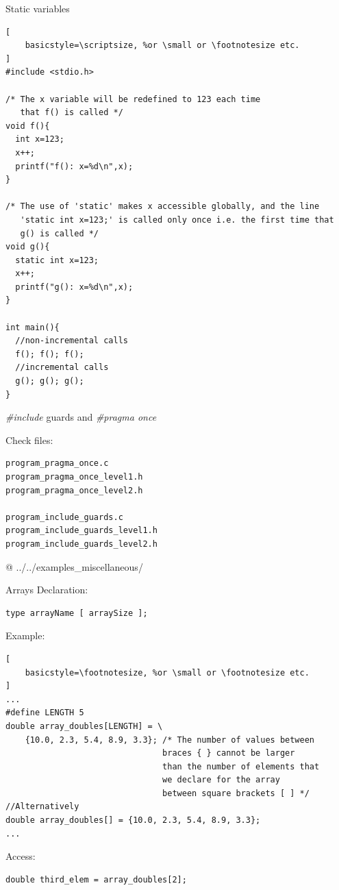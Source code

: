 \documentclass[10pt]{beamer}
\begin{document}
\begin{frame}[fragile]{Static variables}
\begin{lstlisting}[
    basicstyle=\scriptsize, %or \small or \footnotesize etc.
]
#include <stdio.h>

/* The x variable will be redefined to 123 each time
   that f() is called */
void f(){
  int x=123;
  x++;
  printf("f(): x=%d\n",x);
}

/* The use of 'static' makes x accessible globally, and the line
   'static int x=123;' is called only once i.e. the first time that
   g() is called */
void g(){
  static int x=123;
  x++;
  printf("g(): x=%d\n",x);
}

int main(){
  //non-incremental calls
  f(); f(); f();
  //incremental calls
  g(); g(); g();
}
\end{lstlisting}
\end{frame}


\begin{frame}[fragile]{\textit{\#include} guards and \textit{\#pragma once}}

Check files:

\begin{lstlisting}
program_pragma_once.c
program_pragma_once_level1.h
program_pragma_once_level2.h

program_include_guards.c
program_include_guards_level1.h
program_include_guards_level2.h
\end{lstlisting}

@ ../../examples\_miscellaneous/
\end{frame}


\begin{frame}[fragile]{Arrays}
Declaration:

\begin{lstlisting}
type arrayName [ arraySize ];
\end{lstlisting}

Example:

\begin{lstlisting}[
    basicstyle=\footnotesize, %or \small or \footnotesize etc.
]
...
#define LENGTH 5
double array_doubles[LENGTH] = \
    {10.0, 2.3, 5.4, 8.9, 3.3}; /* The number of values between
                                braces { } cannot be larger
                                than the number of elements that
                                we declare for the array
                                between square brackets [ ] */
//Alternatively
double array_doubles[] = {10.0, 2.3, 5.4, 8.9, 3.3};
...
\end{lstlisting}

Access:

\begin{lstlisting}
double third_elem = array_doubles[2];
\end{lstlisting}
\end{frame}
\end{document}

